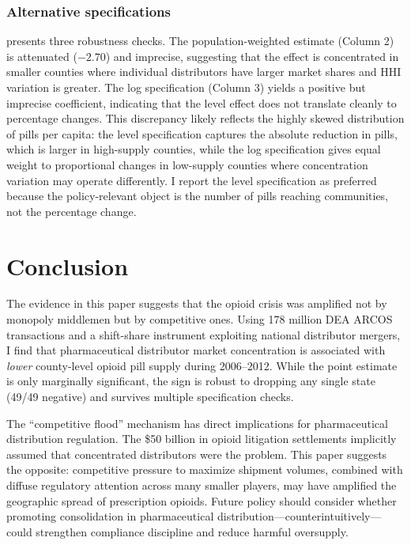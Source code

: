 \documentclass[12pt]{article}
\begin{document}
\subsubsection*{Alternative specifications}  presents three robustness checks. The population-weighted estimate (Column 2) is attenuated ($-2.70$) and imprecise, suggesting that the effect is concentrated in smaller counties where individual distributors have larger market shares and HHI variation is greater. The log specification (Column 3) yields a positive but imprecise coefficient, indicating that the level effect does not translate cleanly to percentage changes. This discrepancy likely reflects the highly skewed distribution of pills per capita: the level specification captures the absolute reduction in pills, which is larger in high-supply counties, while the log specification gives equal weight to proportional changes in low-supply counties where concentration variation may operate differently. I report the level specification as preferred because the policy-relevant object is the number of pills reaching communities, not the percentage change.





\section{Conclusion}
\label{sec:conclusion}

The evidence in this paper suggests that the opioid crisis was amplified not by monopoly middlemen but by competitive ones. Using 178 million DEA ARCOS transactions and a shift-share instrument exploiting national distributor mergers, I find that pharmaceutical distributor market concentration is associated with \emph{lower} county-level opioid pill supply during 2006--2012. While the point estimate is only marginally significant, the sign is robust to dropping any single state (49/49 negative) and survives multiple specification checks.

The ``competitive flood'' mechanism has direct implications for pharmaceutical distribution regulation. The \$50 billion in opioid litigation settlements implicitly assumed that concentrated distributors were the problem. This paper suggests the opposite: competitive pressure to maximize shipment volumes, combined with diffuse regulatory attention across many smaller players, may have amplified the geographic spread of prescription opioids. Future policy should consider whether promoting consolidation in pharmaceutical distribution---counterintuitively---could strengthen compliance discipline and reduce harmful oversupply.
\end{document}
